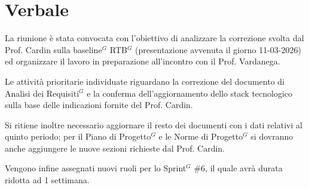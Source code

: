 \documentclass[a4paper,10pt]{article}
\begin{document}
\section*{Verbale}

La riunione è stata convocata con l’obiettivo di analizzare la correzione svolta dal Prof. Cardin sulla baseline$^G$ RTB$^G$ (presentazione avvenuta il giorno 11-03-2026) ed organizzare il lavoro in preparazione all'incontro con il Prof. Vardanega. 

Le attività prioritarie individuate riguardano la correzione del documento di Analisi dei Requisiti$^G$ e la conferma dell'aggiornamento dello stack tecnologico sulla base delle indicazioni fornite del Prof. Cardin. 

Si ritiene inoltre necessario aggiornare il resto dei documenti con i dati relativi al quinto periodo; per il Piano di Progetto$^G$ e le Norme di Progetto$^G$ si dovranno anche aggiungere le nuove sezioni richieste dal Prof. Cardin.

Vengono infine assegnati nuovi ruoli per lo Sprint$^G$ \#6, il quale avrà durata ridotta ad 1 settimana.
\end{document}
